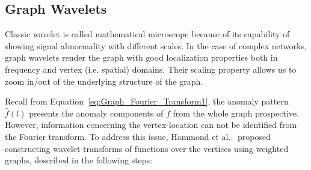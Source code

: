 \subsection{Graph Wavelets}
\label{sec:graph_wavelet}
Classic wavelet is called mathematical microscope because of its capability of showing signal abnormality with different scales.
In the case of complex networks, graph wavelets render the graph with good localization properties both in frequency and vertex (i.e. spatial) domains. Their scaling property allows us to zoom in/out of the underlying structure of the graph.


Recall from Equation~\ref{eq:Graph_Fourier_Transform1}, the anomaly pattern $\hat{f}(l)$ presents the anomaly components of $f$ from the whole graph prospective. However, information concerning the vertex-location can not be identified from the Fourier transform. To address this issue, Hammond et al.~\cite{hammond2011wavelets} proposed constructing wavelet transforms of functions over the vertices using weighted graphs, described in the following steps:

